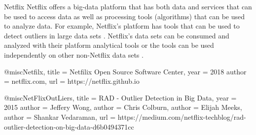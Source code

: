Netflix
Netflix offers a big-data platform that has both data and services that can be used to access data as well as processing tools (algorithms) that can be used to analyze data.  For example, Netflix’s platform has tools that can be used to detect outliers in large data sets  \cite{NetFlixOutLiers}.  Netflix’s data sets can be consumed and analyzed with their platform analytical tools or the tools can be used independently on other non-Netflix data sets \cite{Netflix}. 

@misc{Netfilx,
   title = {Netfilix Open Source Software Center},
   year = {2018}
   author = {netflix.com},
   url = {https://netflix.github.io}
}

@misc{NetFlixOutLiers,
   title = {RAD - Outlier Detection in Big Data},
   year = {2015}
   author = {Jeffery Wong},
   author = {Chris Colburn},
   author = {Elijah Meeks},
   author = {Shankar Vedaraman},
   url = {https://medium.com/netflix-techblog/rad-outlier-detection-on-big-data-d6b0494371cc}
}
